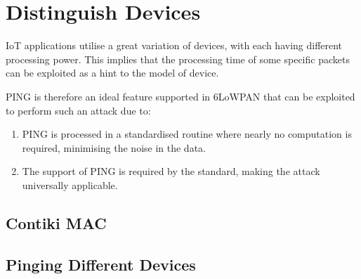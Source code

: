 \section{Distinguish Devices}
IoT applications utilise a great variation of devices, with each having different processing power. This implies that the processing time of some specific packets can be exploited as a hint to the model of device. 

PING is therefore an ideal feature supported in 6LoWPAN that can be exploited to perform such an attack due to:
\begin{enumerate}
	\item PING is processed in a standardised routine where nearly no computation is required, minimising the noise in the data.
	\item The support of PING is required by the standard\cite{rfc4443}, making the attack universally applicable.
\end{enumerate}

\subsection{Contiki MAC}

\subsection{Pinging Different Devices}